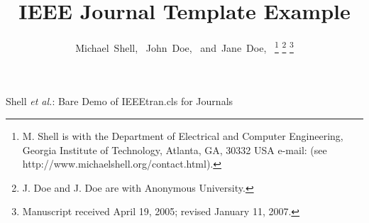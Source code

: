 \documentclass[journal]{IEEEtran}
\theoremstyle{definition}
\begin{document}
%
\title{IEEE Journal Template Example}
%
%
%

\author{Michael~Shell,~
        John~Doe,~
        and~Jane~Doe,~%
\thanks{M. Shell is with the Department
of Electrical and Computer Engineering, Georgia Institute of Technology, Atlanta,
GA, 30332 USA e-mail: (see http://www.michaelshell.org/contact.html).}%
\thanks{J. Doe and J. Doe are with Anonymous University.}%
\thanks{Manuscript received April 19, 2005; revised January 11, 2007.}}

% 
%



%
{Shell \MakeLowercase{\textit{et al.}}: Bare Demo of IEEEtran.cls for Journals}
% 
\end{document}

